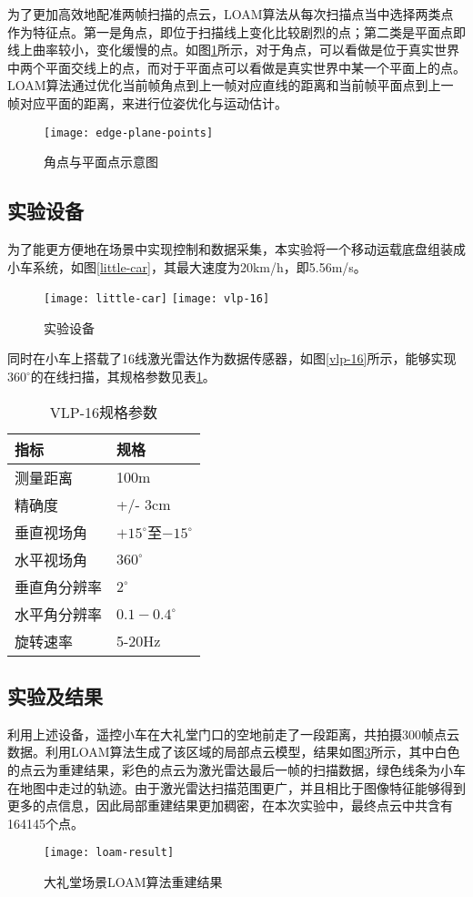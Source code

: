 为了更加高效地配准两帧扫描的点云，LOAM算法从每次扫描点当中选择两类点作为特征点。第一是角点，即位于扫描线上变化比较剧烈的点；第二类是平面点即线上曲率较小，变化缓慢的点。如图\ref{edge-plane-points}所示，对于角点，可以看做是位于真实世界中两个平面交线上的点，而对于平面点可以看做是真实世界中某一个平面上的点。LOAM算法通过优化当前帧角点到上一帧对应直线的距离和当前帧平面点到上一帧对应平面的距离，来进行位姿优化与运动估计。
\begin{figure}
	\centering
	\texttt{[image: edge-plane-points]}
	\caption{角点与平面点示意图}
	\label{edge-plane-points}
\end{figure}

\subsection{实验设备}
为了能更方便地在场景中实现控制和数据采集，本实验将一个移动运载底盘组装成小车系统，如图\ref{little-car}，其最大速度为20km/h，即5.56m/s。
\begin{figure}
	\centering
	{\texttt{[image: little-car]}}
	{\texttt{[image: vlp-16]}}
	\caption{实验设备}
	\label{loam-machine}
\end{figure}
同时在小车上搭载了16线激光雷达作为数据传感器，如图\ref{vlp-16}所示，能够实现$360^\circ$的在线扫描，其规格参数见表\ref{vlp-16-parameters}。
\begin{table}
	\centering
	\caption{VLP-16规格参数}
	\begin{tabular}{ll}
		\toprule
		指标 & 规格 \\
		\midrule
		测量距离 & 100m \\
		精确度 & +/- 3cm \\
		垂直视场角 & $+15^\circ$至$-15^\circ$ \\
		水平视场角 & $360^\circ$ \\
		垂直角分辨率 & $2^\circ$ \\
		水平角分辨率 & $0.1-0.4^\circ$ \\
		旋转速率 & 5-20Hz \\
		\bottomrule
	\end{tabular}
	\label{vlp-16-parameters}
\end{table}

\subsection{实验及结果}
利用上述设备，遥控小车在大礼堂门口的空地前走了一段距离，共拍摄300帧点云数据。利用LOAM算法生成了该区域的局部点云模型，结果如图\ref{loam-result}所示，其中白色的点云为重建结果，彩色的点云为激光雷达最后一帧的扫描数据，绿色线条为小车在地图中走过的轨迹。由于激光雷达扫描范围更广，并且相比于图像特征能够得到更多的点信息，因此局部重建结果更加稠密，在本次实验中，最终点云中共含有164145个点。
\begin{figure}
	\centering
	\texttt{[image: loam-result]}
	\caption{大礼堂场景LOAM算法重建结果}
	\label{loam-result}
\end{figure}

